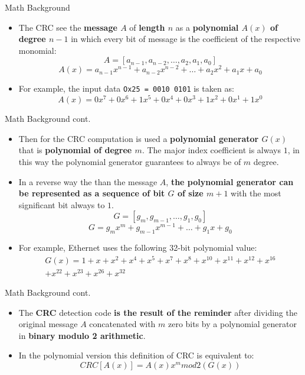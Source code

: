 \documentclass[10pt]{beamer}
\begin{document}
\begin{frame}[fragile]{Math Background}
\begin{itemize}
\item The CRC see the \textbf{message $A$} of \textbf{length $n$} as a 
\textbf{polynomial $A(x)$ of degree $n-1$} in which every bit of message 
is the coefficient of the respective monomial:
\[
   A=[a_{n-1},a_{n-2},\dots{},a_{2},a_{1},a_{0}]
\]
\[
   A(x)=a_{n-1}x^{n-1}+a_{n-2}x^{n-2}+\dots{}+a_{2}x^{2}+a_{1}x+a_{0}
\]

\item For example, the input data \verb|Ox25 = 0010 0101| is taken as:
\[
   A(x)=0x^{7}+0x^{6}+1x^{5}+0x^{4}+0x^{3}+1x^{2}+0x^{1}+1x^{0}
\]
\end{itemize}
\end{frame}


\begin{frame}[fragile]{Math Background cont.}
\begin{itemize}
\item Then for the CRC computation is used a 
\textbf{polynomial generator $G(x)$} that is 
\textbf{polynomial of degree $m$}. The major index coefficient is always 
$1$, in this way the polynomial generator guarantees to always be 
of $m$ degree.

\item In a reverse way the than the message $A$, \textbf{the polynomial 
generator can be represented as a sequence of bit $G$ of size $m+1$} 
with the most significant bit always to $1$.
\[
   G=[g_{m},g_{m-1},\dots{},g_{1},g_{0}] 
\]
\[
   G=g_{m}x^{m}+g_{m-1}x^{m-1}+\dots{}+g_{1}x+g_{0}
\]

\item For example, Ethernet uses the following 32-bit polynomial value:
\begin{gather*}
   G(x)=1+x+x^{2}+x^{4}+x^{5}+x^{7}+x^{8}+x^{10}+x^{11}+x^{12}+x^{16} \\
   +x^{22}+x^{23}+x^{26}+x^{32}
\end{gather*}
\end{itemize}
\end{frame}


\begin{frame}[fragile]{Math Background cont.}
\begin{itemize}
\item The \textbf{CRC} detection code \textbf{is the result of the reminder} 
after dividing the original message $A$ concatenated with $m$ zero bits 
by a polynomial generator in \textbf{binary modulo 2 arithmetic}.

\item In the polynomial version this definition of CRC is equivalent to:
\[
   CRC[A(x)]=A(x)x^{m}mod2(G(x))
\]
\end{itemize}
\end{frame}
\end{document}
